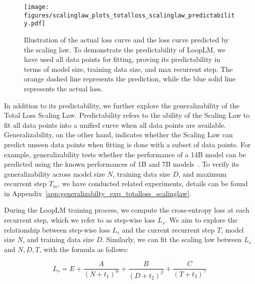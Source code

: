 \documentclass[]{bytedance_seed}
\newcommand{\1}{\mathbf{1}}
\newcommand{\ut}{LoopLM}
\begin{document}
\begin{figure}[htbp!]
    \centering
    \texttt{[image: figures/scalinglaw\_plots\_totalloss\_scalinglaw\_predictability.pdf]}
    \caption{Illustration of the actual loss curve and the loss curve predicted by the scaling law. To demonstrate the predictability of \ut{}, we have used all data points for fitting, proving its predictability in terms of model size, training data size, and max recurrent step. The orange dashed line represents the prediction, while the blue solid line represents the actual loss.}
    \label{fig:scalinglaw_totalloss_scalinglaw_predictability}
\end{figure}

In addition to its predictability, we further explore the generalizability of the Total Loss Scaling Law. Predictability refers to the ability of the Scaling Law to fit all data points into a unified curve when all data points are available. Generalizability, on the other hand, indicates whether the Scaling Law can predict unseen data points when fitting is done with a subset of data points. For example, generalizability tests whether the performance of a 14B model can be predicted using the known performances of 1B and 7B models~\citep{que2024d}. To verify its generalizability across model size $N$, training data size $D$, and maximum recurrent step $T_m$, we have conducted related experiments, details can be found in Appendix~\ref{app:generalizabilty_exp_totalloss_scalinglaw}.

During the \ut{} training process, we compute the cross-entropy loss at each recurrent step, which we refer to as step-wise loss $L_s$. We aim to explore the relationship between step-wise loss $L_s$ and the current recurrent step $T$, model size $N$, and training data size $D$. Similarly, we can fit the scaling law between $L_s$ and $N,D,T$, with the formula as follows:

$$
L_s = E + \frac{A}{(N+t_1)^\alpha} + \frac{B}{(D+t_2)^\beta} + \frac{C}{(T+t_3)^\gamma}
$$
\end{document}
